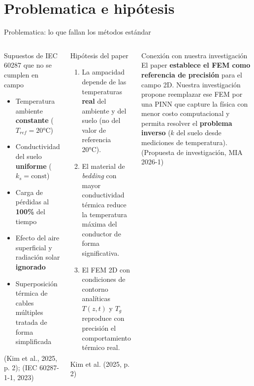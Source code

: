 \documentclass[aspectratio=169]{beamer}
\newcommand{\refcite}[1]{{\footnotesize\color{gray!70!black} #1}}
\begin{document}
\section{Problematica e hipótesis}

\begin{frame}{Problematica: lo que fallan los métodos estándar}
\begin{columns}[T]
\vspace{2.0em}
\begin{alertblock}{Supuestos de IEC\,60287 que no se cumplen en campo}
\scriptsize\justifying
\begin{itemize}[leftmargin=*, itemsep=2pt]
  \item Temperatura ambiente \textbf{constante} ($T_{ref}=20$°C)
  \item Conductividad del suelo \textbf{uniforme} ($k_s = \text{const}$)
  \item Carga de pérdidas al \textbf{100\%} del tiempo
  \item Efecto del aire superficial y radiación solar \textbf{ignorado}
  \item Superposición térmica de cables múltiples tratada de forma
        simplificada
\end{itemize}
\refcite{(Kim et al., 2025, p. 2); (IEC 60287-1-1, 2023)}
\end{alertblock}

\begin{block}{Hipótesis del paper}
\small\justifying
\begin{enumerate}[leftmargin=*, itemsep=3pt]\scriptsize
  \item La ampacidad depende de las temperaturas
        \textbf{real} del ambiente y del suelo (no del valor de
        referencia 20°C).
  \item El material de \textit{bedding} con mayor conductividad
        térmica reduce la temperatura máxima del conductor de forma
        significativa.
  \item El FEM 2D con condiciones de contorno analíticas $T(z,t)$
        y $T_g$ reproduce con precisión el comportamiento térmico real.
\end{enumerate}
\refcite{Kim et al. (2025, p. 2)}
\end{block}

\vspace{0.4em}
\begin{exampleblock}{\small Conexión con nuestra investigación}
\scriptsize
El paper \textbf{establece el FEM como referencia de precisión} para el
campo 2D. Nuestra investigación propone reemplazar ese FEM por una PINN
que capture la física con menor costo computacional y permita resolver el
\textbf{problema inverso} ($k$ del suelo desde mediciones de temperatura).
\refcite{(Propuesta de investigación, MIA 2026-1)}
\end{exampleblock}
\end{columns}
\end{frame}
\end{document}
